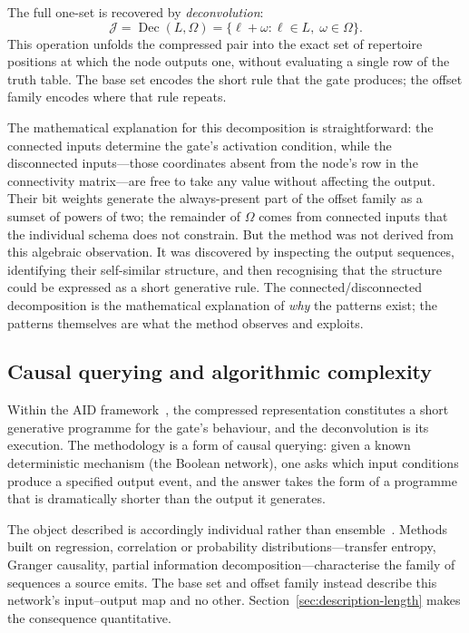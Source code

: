 \documentclass[11pt]{article}
\begin{document}
The full one-set is recovered by \emph{deconvolution}:
\[
\mathcal{J} = \operatorname{Dec}(L,\Omega)
= \{\ell + \omega : \ell\in L,\; \omega\in\Omega\}.
\]
This operation unfolds the compressed pair into the exact set of
repertoire positions at which the node outputs one, without evaluating a
single row of the truth table.  The base set encodes the short rule that
the gate produces; the offset family encodes where that rule repeats.

The mathematical explanation for this decomposition is straightforward:
the connected inputs determine the gate's activation condition, while the
disconnected inputs---those coordinates absent from the node's row in the
connectivity matrix---are free to take any value without affecting the
output.  Their bit weights generate the always-present part of the offset family
as a sumset of powers of two; the remainder of $\Omega$ comes from connected
inputs that the individual schema does not constrain.  But the method was not
derived from this algebraic
observation.  It was discovered by inspecting the output sequences,
identifying their self-similar structure, and then recognising that the
structure could be expressed as a short generative rule.  The
connected/disconnected decomposition is the mathematical explanation of
\emph{why} the patterns exist; the patterns themselves are what the method
observes and exploits.

\subsection{Causal querying and algorithmic complexity}\label{sec:aid-querying}

Within the AID framework~\cite{zenilcalculus,zenildeconv}, the compressed
representation constitutes a short generative programme for the gate's
behaviour, and the deconvolution is its execution.  The methodology is a
form of causal querying: given a known deterministic mechanism (the Boolean
network), one asks which input conditions produce a specified output event,
and the answer takes the form of a programme that is dramatically shorter
than the output it generates.

The object described is accordingly individual rather than
ensemble~\cite{hernandez2019}.  Methods built on regression, correlation or
probability distributions---transfer entropy, Granger causality, partial
information decomposition---characterise the family of sequences a source
emits.  The base set and offset family instead describe this network's
input--output map and no other.  Section~\ref{sec:description-length} makes
the consequence quantitative.
\end{document}
